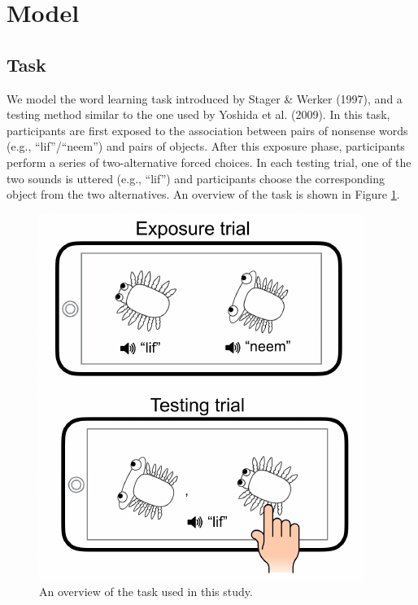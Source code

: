 \documentclass[10pt, letterpaper]{article}
\newenvironment{CodeChunk}{}{}
\begin{document}
\section{Model}\label{model}

\subsection{Task}\label{task}

We model the word learning task introduced by Stager \& Werker (1997),
and a testing method similar to the one used by Yoshida et al. (2009).
In this task, participants are first exposed to the association between
pairs of nonsense words (e.g., ``lif''/``neem'') and pairs of objects.
After this exposure phase, participants perform a series of
two-alternative forced choices. In each testing trial, one of the two
sounds is uttered (e.g., ``lif'') and participants choose the
corresponding object from the two alternatives. An overview of the task
is shown in Figure \ref{fig:task}.

\begin{CodeChunk}
\begin{figure}[t]

{\centering \includegraphics{figs/task-1} 

}

\caption{\label{fig:task}An overview of the task used in this study.}\label{fig:task}
\end{figure}
\end{CodeChunk}
\end{document}
